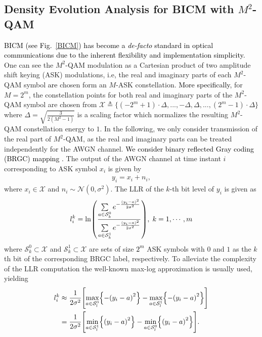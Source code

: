 \documentclass[journal]{IEEEtran}
\newcommand{\SH}{\textcolor{black}}
\newcommand{\GL}{\textcolor{black}}
\let\originalleft\left
\let\originalright\right
\renewcommand{\left}{\mathopen{}\mathclose\bgroup\originalleft}
\renewcommand{\right}{\aftergroup\egroup\originalright}
\begin{document}
\subsection{Density Evolution Analysis for BICM with $M^{2}$-QAM}\label{QAM_BICM}

\GL{BICM \cite{Zehavi1992,Caire1998} (see Fig.~\ref{BICM}) has become a \emph{de-facto} standard in optical communications \cite{georg_tcom,Buchali_2016} due to the inherent flexibility and implementation simplicity.} 
One can see the $M^{2}$-QAM modulation as a Cartesian product of two amplitude shift keying (ASK) modulations, i.e, the real and imaginary parts of each $M^{2}$-QAM symbol \GL{are} chosen form an $M$-ASK constellation. \GL{More specifically}, for $M=2^{m}$, the constellation points for both real and imaginary parts of the $M^{2}$-QAM symbol are chosen from $\mathcal{X}\triangleq\{(-2^m+1)\cdot \Delta ,...,-\Delta,\Delta,...,(2^m-1)\cdot \Delta\}$ where $\Delta=\sqrt{\frac{3}{2(M^2-1)}}$ is a scaling factor which normalizes the resulting $M^{2}$-QAM constellation energy to $1$. In the following, we only consider transmission of the real part of $M^{2}$-QAM, as the real and imaginary parts can be treated independently for the AWGN channel.  
\SH{We consider binary reflected Gray coding (BRGC) mapping \cite{BRGC}.}
The output of the AWGN channel at time instant $i$ corresponding to ASK symbol $x_{i}$ is given by 
\begin{align}\label{channel_inst1}
y_{i}=x_{i}+n_{i},
\end{align}  
where $x_{i}\in \mathcal{X}$ and $n_{i}\sim \mathcal{N}(0,\sigma^2)$. 
The LLR of the $k$-th bit level of $y_{i}$ is given as
\begin{align} \label{LLR}
l_i^k = \ln \left(\frac{\sum\limits_{a \in \mathcal{S}_k^0} {{e^{ - \frac{{({y_i} - a{)^2}}}{{2\sigma^2}}}}} }{{\sum\limits_{a \in \mathcal{S}_k^1} {{e^{ - \frac{{({y_i} - a{)^2}}}{{2\sigma^2}}}  }} }}\right),\;k=1,\cdots,m
\end{align}  
where $\mathcal{S}_k^0 \subset \mathcal{X}$ and $\mathcal{S}_k^1 \subset \mathcal{X}$ are sets of size \SH{$2^{m}$} ASK symbols with $0$ and $1$ as the $k$th bit of the corresponding BRGC label, respectively. To alleviate the complexity of the LLR computation the well-known max-log approximation is usually used, yielding \cite[Eq.~6]{Viterbi1998}
\begin{align} \label{LLRMaxlog}
l_i^k & \approx \frac{1}{{2{\sigma ^2}}}\left[ {\mathop {\max }\limits_{a \in {\cal S}_l^0} \left\{ {{{-\left( {{y_i} - a} \right)}^2}} \right\} - \mathop {\max }\limits_{a \in {\cal S}_l^1} \left\{ {{{-\left( {{y_i} - a} \right)}^2}} \right\}} \right] \nonumber \\ &= \frac{1}{{2{\sigma ^2}}}\left[ {\mathop {\min }\limits_{a \in {\cal S}_l^1} \left\{ {{{\left( {{y_i} - a} \right)}^2}} \right\} - \mathop {\min }\limits_{a \in {\cal S}_l^0} \left\{ {{{\left( {{y_i} - a} \right)}^2}} \right\}} \right].
\end{align}         
\end{document}
